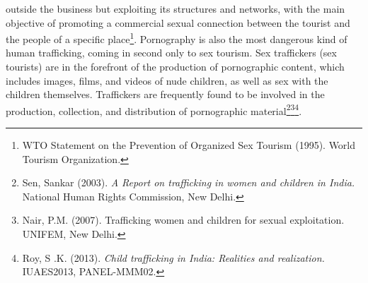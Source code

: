 \begin{multicols}{2}
\noi
outside the business but exploiting its structures and networks, with the main objective of promoting a commercial sexual connection between the tourist and the people of a specific place\footnote{ WTO Statement on the Prevention of Organized Sex Tourism (1995). World Tourism Organization.}. Pornography is also the most dangerous kind of human trafficking, coming in second only to sex tourism. Sex traffickers (sex tourists) are in the forefront of the production of pornographic content, which includes images, films, and videos of nude children, as well as sex with the children themselves. Traffickers are frequently found to be involved in the production, collection, and distribution of pornographic material\footnote{Sen, Sankar (2003). \textit{A Report on trafficking in women and children in India.} National Human Rights Commission, New Delhi.}\footnote{Nair, P.M. (2007). Trafficking women and children for sexual exploitation. UNIFEM, New Delhi.}\footnote{Roy, S .K. (2013). \textit{Child trafficking in India: Realities and realization.} IUAES2013, PANEL-MMM02.}.


\end{multicols}
